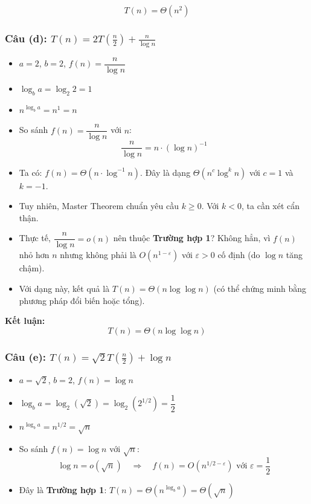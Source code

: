\documentclass{article}
\begin{document}
\[
\boxed{T(n) = \Theta(n^2)}
\]

\subsubsection{Câu (d): \( T(n) = 2T\left(\frac{n}{2}\right) + \frac{n}{\log n} \)}

\begin{itemize}
    \item \(a = 2\), \(b = 2\), \(f(n) = \dfrac{n}{\log n}\)
    \item \(\log_b a = \log_2 2 = 1\)
    \item \(n^{\log_b a} = n^1 = n\)
    \item So sánh \(f(n) = \dfrac{n}{\log n}\) với \(n\):
    \[
    \frac{n}{\log n} = n \cdot (\log n)^{-1}
    \]
    \item Ta có: \(f(n) = \Theta(n \cdot \log^{-1} n)\). Đây là dạng \(\Theta(n^c \log^k n)\) với \(c = 1\) và \(k = -1\).
    \item Tuy nhiên, Master Theorem chuẩn yêu cầu \(k \ge 0\). Với \(k < 0\), ta cần xét cẩn thận.
    \item Thực tế, \(\dfrac{n}{\log n} = o(n)\) nên thuộc \textbf{Trường hợp 1}? Không hẳn, vì \(f(n)\) nhỏ hơn \(n\) nhưng không phải là \(O(n^{1-\varepsilon})\) với \(\varepsilon > 0\) cố định (do \(\log n\) tăng chậm).
    \item Với dạng này, kết quả là \(T(n) = \Theta(n \log \log n)\) (có thể chứng minh bằng phương pháp đổi biến hoặc tổng).
\end{itemize}

\textbf{Kết luận:}
\[
\boxed{T(n) = \Theta(n \log \log n)}
\]

\subsubsection{Câu (e): \( T(n) = \sqrt{2}T\left(\frac{n}{2}\right) + \log n \)}

\begin{itemize}
    \item \(a = \sqrt{2}\), \(b = 2\), \(f(n) = \log n\)
    \item \(\log_b a = \log_2 (\sqrt{2}) = \log_2 (2^{1/2}) = \dfrac{1}{2}\)
    \item \(n^{\log_b a} = n^{1/2} = \sqrt{n}\)
    \item So sánh \(f(n) = \log n\) với \(\sqrt{n}\):
    \[
    \log n = o(\sqrt{n}) \quad \Rightarrow \quad f(n) = O\left(n^{1/2 - \varepsilon}\right) \text{ với } \varepsilon = \frac{1}{2}
    \]
    \item Đây là \textbf{Trường hợp 1}: \(T(n) = \Theta(n^{\log_b a}) = \Theta(\sqrt{n})\)
\end{itemize}
\end{document}

